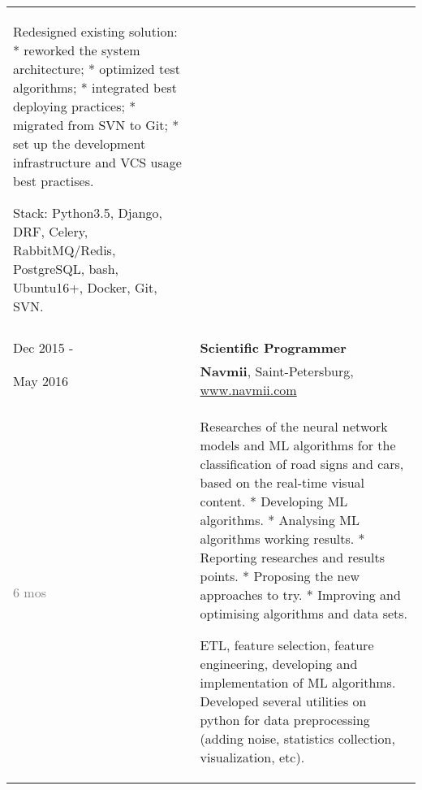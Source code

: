 \documentclass[a4paper,10pt]{article}
\begin{document}
\begin{tabularx}{\textwidth}{lX}
{                                    Redesigned existing solution:\newline
                                    * reworked the system architecture;\newline
                                    * optimized test algorithms;\newline
                                    * integrated best deploying practices;\newline
                                    * migrated from SVN to Git;\newline
                                    * set up the development infrastructure and VCS usage best practises.\newline
                                    
                                    Stack: Python3.5, Django, DRF, Celery, RabbitMQ/Redis, PostgreSQL, bash, Ubuntu16+, Docker, Git, SVN.\newline
                                } \\

    \multicolumn{2}{c}{}\\
    \pagebreak
    \noindent

    Dec 2015 -              &   \textbf{Scientific Programmer} \\
    May 2016                &   \textbf{Navmii}, Saint-Petersburg,
                                \href{www.navmii.com}{www.navmii.com} \\
    \textcolor{gray}
    {6 mos}
                            &   \footnotesize{

                                    Researches of the neural network models and ML algorithms for the classification of road signs and cars, based on the real-time visual content.\newline
                                    * Developing ML algorithms.\newline
                                    * Analysing ML algorithms working results.\newline
                                    * Reporting researches and results points.\newline
                                    * Proposing the new approaches to try.\newline
                                    * Improving and optimising algorithms and data sets.\newline

                                    ETL, feature selection, feature engineering, developing and implementation of ML
                                    algorithms.\newline
                                    Developed several utilities on python for data preprocessing (adding noise,
                                    statistics collection, visualization, etc).\newline

}
\end{tabularx}
\end{document}
